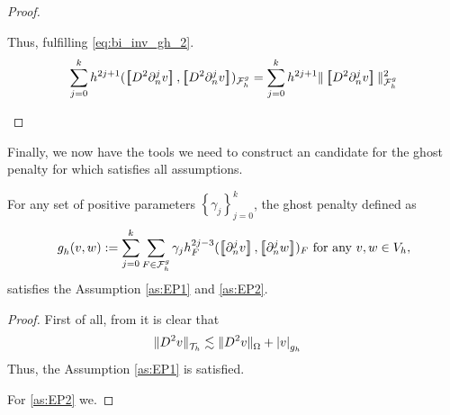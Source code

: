 \begin{proof}
\begin{enumerate}[label=\arabic*)]
        Thus, fulfilling \eqref{eq:bi_inv_gh_2}.
        \[
            \begin{split}
         \sum_{j=0}^{k} h^{2j+1} ( \jump{   D^2 \partial ^{j}_{n}  v }, \jump{  D^2 \partial ^{j}_{n}  v}    )_{\mathcal{F}_{h}^{g}} = \sum_{j=0}^{k} h^{2j+1}  \|\jump{   D^2 \partial ^{j}_{n}  v }  \|_{\mathcal{F} _{h}^{g}  }^{2  }
            \end{split}
        \]

    \end{enumerate}

\end{proof}



Finally, we now have the tools we need to construct an candidate for the ghost penalty for which satisfies all assumptions.

\begin{proposition}
    For any set of positive parameters $\left\{ \gamma _{j} \right\} _{j=0}^{k}$, the ghost penalty defined as \[
    g^{}_{h}( v,w)  := \sum_{j=0}^{k} \sum_{F \in \mathcal{F} _{h}^{g}}^{} \gamma _{j} h^{2j-3}_{F} ( \jump{ \partial ^{j}_{n} v }, \jump{ \partial ^{j}_{n} w }  ) _{F} \text{ for any } v,w \in V_{h},
    \]
    satisfies the Assumption \ref{as:EP1} and \ref{as:EP2}.
\end{proposition}

\begin{proof}
    First of all, from it is clear that \[
        \begin{split}
    \| D^2v \|_{ \mathcal{T} _{h} }^{  } & \lesssim \| D^2 v \|_{ \Omega   }^{  } + \left\lvert  v  \right\rvert _{g_{h}}
        \end{split}
    \]
    Thus, the Assumption \ref{as:EP1} is satisfied.

    For \ref{as:EP2} we.
\end{proof}
